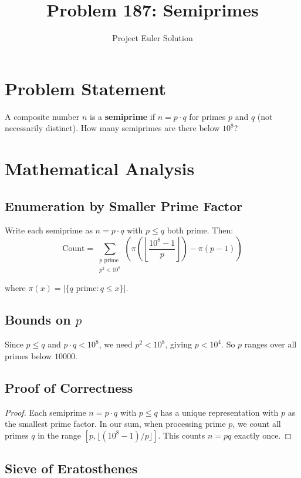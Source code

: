 \documentclass[12pt]{article}
\title{Problem 187: Semiprimes}
\author{Project Euler Solution}
\date{}
\begin{document}
\maketitle

\section{Problem Statement}

A composite number $n$ is a \textbf{semiprime} if $n = p \cdot q$ for primes $p$ and $q$ (not necessarily distinct). How many semiprimes are there below $10^8$?

\section{Mathematical Analysis}

\subsection{Enumeration by Smaller Prime Factor}

Write each semiprime as $n = p \cdot q$ with $p \le q$ both prime. Then:
\[
\text{Count} = \sum_{\substack{p \text{ prime} \\ p^2 < 10^8}} \left( \pi\!\left(\left\lfloor \frac{10^8 - 1}{p} \right\rfloor\right) - \pi(p-1) \right)
\]

where $\pi(x) = |\{q \text{ prime} : q \le x\}|$.

\subsection{Bounds on $p$}

Since $p \le q$ and $p \cdot q < 10^8$, we need $p^2 < 10^8$, giving $p < 10^4$. So $p$ ranges over all primes below $10000$.

\subsection{Proof of Correctness}

\begin{proof}
Each semiprime $n = p \cdot q$ with $p \le q$ has a unique representation with $p$ as the smallest prime factor. In our sum, when processing prime $p$, we count all primes $q$ in the range $[p, \lfloor(10^8-1)/p\rfloor]$. This counts $n = pq$ exactly once.
\end{proof}

\subsection{Sieve of Eratosthenes}
\end{document}
